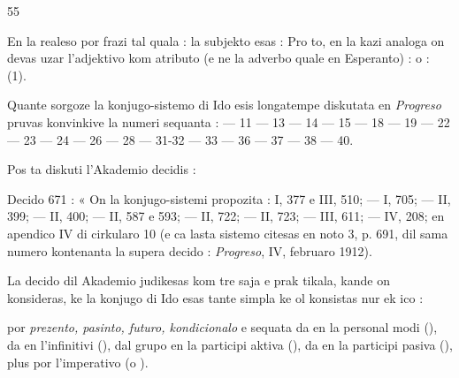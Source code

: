 \begin{VUpage}[59]{55}

En la realeso por frazi tal quala : \nl
la subjekto esas :  Pro to, en la kazi analoga\nl
on devas uzar l'adjektivo kom atributo (e ne la adverbo\nl
quale en Esperanto) :  o : \nl
{} (1).

\VUblanc{11.09pt}%
Quante sorgoze la konjugo-sistemo di Ido esis longatempe\nl
diskutata en \textit{Progreso} pruvas konvinkive la numeri sequanta : --- 11 --- 13 --- 14 --- 15 --- 18 --- 19 --- 22 --- 23\nl
--- 24 --- 26 --- 28 --- 31-32 --- 33 --- 36 --- 37 --- 38 --- 40.

\VUblanc{2.97pt}%
Pos ta diskuti l'Akademio decidis :

\VUblancAlinea
Decido 671 : « On  la konjugo-sistemi propozita :\nl
I, 377 e III, 510; --- I, 705; --- II, 399; --- II, 400; ---\nl
II, 587 e 593; --- II, 722; --- II, 723; --- III, 611; ---\nl
IV, 208; en apendico IV di cirkularo 10 (e ca lasta sistemo\nl
citesas en noto 3, p. 691, dil sama numero kontenanta la\nl
supera decido : \textit{Progreso}, IV, februaro 1912).

\VUblancAlinea
La decido dil Akademio judikesas kom tre saja e prak\cc
tikala, kande on konsideras, ke la konjugo di Ido esas tante\nl
simpla ke ol konsistas nur ek ico :

\VUblancAlinea
{} por \textit{prezento, pasinto, futuro, kondicionalo} e\nl
sequata da  en la personal modi (), da  en\nl
l'infinitivi (), dal grupo  en la participi aktiva\nl
(), da  en la participi pasiva (),\nl
plus  por l'imperativo (o ).


\end{VUpage}
